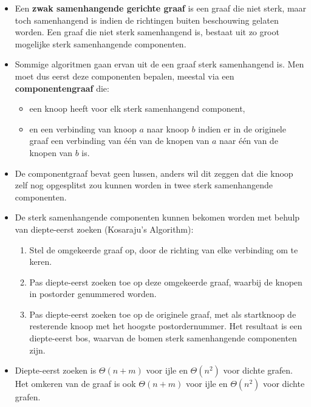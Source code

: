 \begin{itemize}
	\item Een \textbf{zwak samenhangende gerichte graaf} is een graaf die niet sterk, maar toch samenhangend is indien de richtingen buiten beschouwing gelaten worden. Een graaf die niet sterk samenhangend is, bestaat uit zo groot mogelijke sterk samenhangende componenten. 
	\item Sommige algoritmen gaan ervan uit de een graaf sterk samenhangend is. Men moet dus eerst deze componenten bepalen, meestal via een \textbf{componentengraaf} die:
	\begin{itemize}
		\item een knoop heeft voor elk sterk samenhangend component,
		\item en een verbinding van knoop $a$ naar knoop $b$ indien er in de originele graaf een verbinding van één van de knopen van $a$ naar één van de knopen van $b$ is. 
	\end{itemize}
	\item De componentgraaf bevat geen lussen, anders wil dit zeggen dat die knoop zelf nog opgesplitst zou kunnen worden in twee sterk samenhangende componenten.
	\item De sterk samenhangende componenten kunnen bekomen worden met behulp van diepte-eerst zoeken (Kosaraju's Algorithm):
	\begin{enumerate}
		\item Stel de omgekeerde graaf op, door de richting van elke verbinding om te keren.
		\item Pas diepte-eerst zoeken toe op deze omgekeerde graaf, waarbij de knopen in postorder genummered worden.
		\item Pas diepte-eerst zoeken toe op de originele graaf, met als startknoop de resterende knoop met het hoogste postordernummer. Het resultaat is een diepte-eerst bos, waarvan de bomen sterk samenhangende componenten zijn.
	\end{enumerate}
	\item Diepte-eerst zoeken is $\Theta(n + m)$ voor ijle en $\Theta(n^2)$ voor dichte grafen. Het omkeren van de graaf is ook $\Theta(n + m)$ voor ijle en $\Theta(n^2)$ voor dichte grafen.
\end{itemize}




